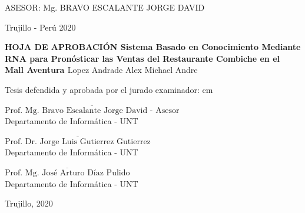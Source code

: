 \vskip 3.2cm
\begin{center}
   {\bf \doublespacing {\fontsize{17}{20.4}\selectfont{SISTEMA BASADO EN CONOCIMIENTO MEDIANTE RNA PARA PRONÓSTICAR LAS VENTAS  DEL RESTAURANTE COMBICHE EN EL MALL AVENTURA }}}     
\end{center}   
  \vskip 2cm
\begin{verse}
 \fontsize{12}{14.4}
\end{verse}
%
\vskip 1.5cm 
{\fontsize{14}{16.8}\selectfont ASESOR: Mg. BRAVO ESCALANTE JORGE DAVID} 
 \vskip 1cm 
 \begin{center}    
 \vskip 2cm
{\fontsize{14}{16.8}\selectfont Trujillo - Perú
\vskip 0.2cm
\hspace*{-0.2cm} 
2020}
\end{center} 
\newpage
%
\begin{center}
 {\bf {\Large HOJA DE APROBACIÓN }     
 \vskip 1.5cm
  {\Large Sistema Basado en Conocimiento Mediante RNA para Pronósticar las Ventas del Restaurante Combiche en el Mall Aventura }}
 \vskip 1cm 
  \large{Lopez Andrade Alex Michael Andre}
 \vskip 1cm
\end{center} 
Tesis defendida y aprobada por el jurado examinador:
 cm
\begin{flushleft} 
$\overline{\mbox{Prof. Mg. Bravo Escalante Jorge David - Asesor}}$\\
\vskip -0.5cm
Departamento de Informática - UNT
\end{flushleft} 
\vskip 1cm
\begin{flushleft} 
$\overline{\mbox{Prof. Dr. Jorge Luis Gutierrez Gutierrez}}$\\
\vskip -0.5cm
Departamento de Informática - UNT
\end{flushleft} 
\vskip 1cm
\begin{flushleft} 
$\overline{\mbox{Prof. Mg. José Arturo Díaz Pulido}}$\\
\vskip -0.5cm
Departamento de Informática - UNT
\end{flushleft}
\vskip 0.8cm 
\begin{center}    
Trujillo, 2020
\end{center} 
\newpage


